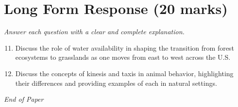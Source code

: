 \documentclass[12pt]{article}
\begin{document}
\section*{Long Form Response (20 marks)}
\textit{Answer each question with a clear and complete explanation.}
\begin{enumerate}[label=\arabic*.]
\setcounter{enumi}{10}
\item Discuss the role of water availability in shaping the transition from forest ecosystems to grasslands as one moves from east to west across the U.S.
\item Discuss the concepts of kinesis and taxis in animal behavior, highlighting their differences and providing examples of each in natural settings.
\end{enumerate}

\vfill
\noindent\textit{End of Paper}
\end{document}
